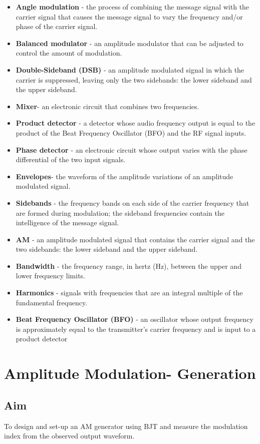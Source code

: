 \documentclass{book}
\begin{document}
\begin{itemize}
\item \textbf{Angle modulation} - the process of combining the message signal with the carrier signal that causes the message signal to vary the frequency and/or phase of the
carrier signal.
\item \textbf{Balanced modulator} - an amplitude modulator that can be adjusted to control the
amount of modulation.
\item \textbf{Double-Sideband (DSB)} - an amplitude modulated signal in which the carrier is
suppressed, leaving only the two sidebands: the lower sideband and the upper
sideband.
\item \textbf{Mixer}- an electronic circuit that combines two frequencies.
\item \textbf{Product detector} - a detector whose audio frequency output is equal to the product of the
Beat
Frequency Oscillator (BFO) and the RF signal inputs.
\item \textbf{Phase detector} - an electronic circuit whose output varies with the phase differential
of the two input signals.
\item \textbf{Envelopes}- the waveform of the amplitude variations of an amplitude modulated
signal. 
\item \textbf{Sidebands} - the frequency bands on each side of the carrier frequency that
are formed during modulation; the sideband frequencies contain the intelligence of
the message signal.
\item \textbf{AM} - an amplitude modulated signal that contains the carrier signal and the two
sidebands: the lower sideband and the upper sideband.
\item \textbf{Bandwidth} - the frequency range, in hertz (Hz), between the upper and lower
frequency limits. 
\item \textbf{Harmonics} - signals with frequencies that are an integral multiple of
the fundamental frequency. 
\item \textbf{Beat Frequency Oscillator (BFO)} - an oscillator whose
output frequency is approximately equal to the transmitter's carrier frequency and is
input to a product detector
\end {itemize}
\chapter[Amplitude Modulation- Generation]{Amplitude Modulation- Generation}

\section*{Aim}
To design and set-up  an AM generator using BJT and measure the modulation index from the observed output waveform.
\end{document}
